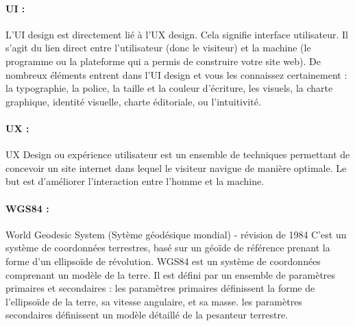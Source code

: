 \paragraph{UI :}
L’UI design est directement lié à l’UX design. Cela signifie interface 
utilisateur. Il s’agit du lien direct entre l’utilisateur (donc le visiteur) 
et la machine (le programme ou la plateforme qui a permis de construire 
votre site web). De nombreux éléments entrent dans l’UI design et vous 
les connaissez certainement : la typographie, la police, la taille et la 
couleur d’écriture, les visuels, la charte graphique, identité visuelle, 
charte éditoriale, ou l’intuitivité.

\paragraph{UX :}
UX Design ou expérience utilisateur est un ensemble de techniques 
permettant de concevoir un site internet dans lequel le visiteur navigue 
de manière optimale. Le but est d’améliorer l’interaction entre l’homme 
et la machine. 

\paragraph{WGS84 :}
World Geodesic System (Sytème géodésique mondial) - révision de 1984
C'est un système de coordonnées terrestres, basé sur un géoïde de référence 
prenant la forme d'un ellipsoïde de révolution.
WGS84 est un système de coordonnées comprenant un modèle de la terre. Il est 
défini par un ensemble de paramètres primaires et secondaires :
les paramètres primaires définissent la forme de l'ellipsoïde de la terre, sa vitesse angulaire, et sa masse.
les paramètres secondaires définissent un modèle détaillé de la pesanteur terrestre.
